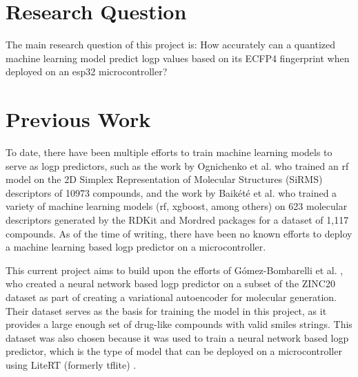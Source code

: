 \section{Research Question}

The main research question of this project is:
How accurately can a quantized machine learning model predict \gls{logp} values based on its \acrshort{ECFP4} \gls{fingerprint} when deployed on an \gls{esp32} microcontroller?

\section{Previous Work}

To date, there have been multiple efforts to train machine learning models to serve as \gls{logp} predictors,
such as the work by Ognichenko et al. \cite{logp-rf} who trained an \gls{rf} model on the 2D Simplex Representation of Molecular Structures (SiRMS) descriptors \cite{sirms} of 10973 compounds, 
and the work by Baik\'et\'e et al. \cite{logp_ml} who trained a variety of machine learning models (\gls{rf}, \gls{xgboost}, among others) on 623 molecular descriptors generated by the RDKit \cite{rdkit} and Mordred \cite{mordred} packages for a dataset of 1,117 compounds.
As of the time of writing, there have been no known efforts to deploy a machine learning based \gls{logp} predictor on a microcontroller.

This current project aims to build upon the efforts of G\'omez-Bombarelli et al. \cite{zinc20source}, who created a neural network based \gls{logp} predictor
on a subset of the \gls{ZINC20} dataset \cite{zinc} as part of creating a variational autoencoder for molecular generation. 
Their dataset serves as the basis for training the model in this project, as it provides a large enough set of drug-like compounds with valid \gls{smiles} strings.
This dataset was also chosen because it was used to train a neural network based \gls{logp} predictor, which is the type of model that can be deployed on a microcontroller using LiteRT (formerly \gls{tflite}) \cite{litert}.